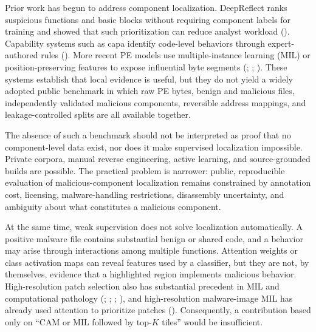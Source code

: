 \documentclass[
  10pt,
]{article}
\begin{document}
Prior work has begun to address component localization. DeepReflect
ranks suspicious functions and basic blocks without requiring component
labels for training and showed that such prioritization can reduce
analyst workload (). Capability systems such as capa identify code-level behaviors
through expert-authored rules (). More recent PE models use multiple-instance learning
(MIL) or position-preserving features to expose influential byte
segments (; ;
). These
systems establish that local evidence is useful, but they do not yield a
widely adopted public benchmark in which raw PE bytes, benign and
malicious files, independently validated malicious components,
reversible address mappings, and leakage-controlled splits are all
available together.

The absence of such a benchmark should not be interpreted as proof that
no component-level data exist, nor does it make supervised localization
impossible. Private corpora, manual reverse engineering, active
learning, and source-grounded builds are possible. The practical problem
is narrower: public, reproducible evaluation of malicious-component
localization remains constrained by annotation cost, licensing,
malware-handling restrictions, disassembly uncertainty, and ambiguity
about what constitutes a malicious component.

At the same time, weak supervision does not solve localization
automatically. A positive malware file contains substantial benign or
shared code, and a behavior may arise through interactions among
multiple functions. Attention weights or class activation maps can
reveal features used by a classifier, but they are not, by themselves,
evidence that a highlighted region implements malicious behavior.
High-resolution patch selection also has substantial precedent in MIL
and computational pathology (; ;
;
), and high-resolution
malware-image MIL has already used attention to prioritize patches
().
Consequently, a contribution based only on ``CAM or MIL followed by
top-\(K\) tiles'' would be insufficient.
\end{document}
